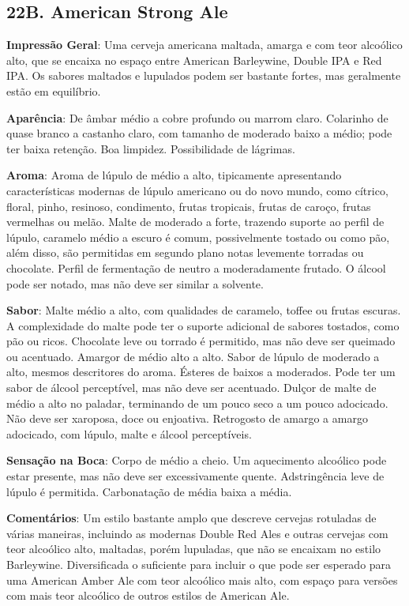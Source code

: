 \subsection*{22B. American Strong Ale}
\textbf{Impressão Geral}: Uma cerveja americana maltada, amarga e com teor alcoólico alto, que se encaixa no espaço entre American Barleywine, Double IPA e Red IPA. Os sabores maltados e lupulados podem ser bastante fortes, mas geralmente estão em equilíbrio.

\textbf{Aparência}: De âmbar médio a cobre profundo ou marrom claro. Colarinho de quase branco a castanho claro, com tamanho de moderado baixo a médio; pode ter baixa retenção. Boa limpidez. Possibilidade de lágrimas.

\textbf{Aroma}: Aroma de lúpulo de médio a alto, tipicamente apresentando características modernas de lúpulo americano ou do novo mundo, como cítrico, floral, pinho, resinoso, condimento, frutas tropicais, frutas de caroço, frutas vermelhas ou melão. Malte de moderado a forte, trazendo suporte ao perfil de lúpulo, caramelo médio a escuro é comum, possivelmente tostado ou como pão, além disso, são permitidas em segundo plano notas levemente torradas ou chocolate. Perfil de fermentação de neutro a moderadamente frutado. O álcool pode ser notado, mas não deve ser similar a solvente.

\textbf{Sabor}: Malte médio a alto, com qualidades de caramelo, toffee ou frutas escuras. A complexidade do malte pode ter o suporte adicional de sabores tostados, como pão ou ricos. Chocolate leve ou torrado é permitido, mas não deve ser queimado ou acentuado. Amargor de médio alto a alto. Sabor de lúpulo de moderado a alto, mesmos descritores do aroma. Ésteres de baixos a moderados. Pode ter um sabor de álcool perceptível, mas não deve ser acentuado. Dulçor de malte de médio a alto no paladar, terminando de um pouco seco a um pouco adocicado. Não deve ser xaroposa, doce ou enjoativa. Retrogosto de amargo a amargo adocicado, com lúpulo, malte e álcool perceptíveis.

\textbf{Sensação na Boca}: Corpo de médio a cheio. Um aquecimento alcoólico pode estar presente, mas não deve ser excessivamente quente. Adstringência leve de lúpulo é permitida. Carbonatação de média baixa a média.

\textbf{Comentários}: Um estilo bastante amplo que descreve cervejas rotuladas de várias maneiras, incluindo as modernas Double Red Ales e outras cervejas com teor alcoólico alto, maltadas, porém lupuladas, que não se encaixam no estilo Barleywine. Diversificada o suficiente para incluir o que pode ser esperado para uma American Amber Ale com teor alcoólico mais alto, com espaço para versões com mais teor alcoólico de outros estilos de American Ale.

